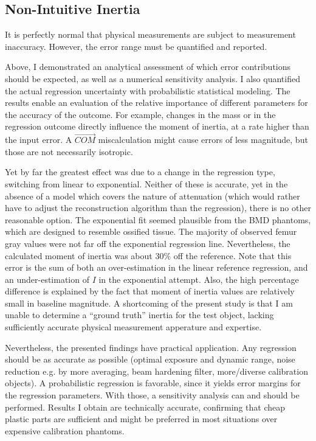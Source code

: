 \subsection{Non-Intuitive Inertia}
\label{sec:orga608fd2}
It is perfectly normal that physical measurements are subject to measurement inaccuracy.
However, the error range must be quantified and reported.

Above, I demonstrated an analytical assessment of which error contributions should be expected, as well as a numerical sensitivity analysis.
I also quantified the actual regression uncertainty with probabilistic statistical modeling.
The results enable an evaluation of the relative importance of different parameters for the accuracy of the outcome.
For example, changes in the mass or in the regression outcome directly influence the moment of inertia, at a rate higher than the input error.
A \(\vec{COM}\) miscalculation might cause errors of less magnitude, but those are not necessarily isotropic.


Yet by far the greatest effect was due to a change in the regression type, switching from linear to exponential.
Neither of these is accurate, yet in the absence of a model which covers the nature of attenuation (which would rather have to adjust the reconstruction algorithm than the regression), there is no other reasonable option.
The exponential fit seemed plausible from the BMD phantoms, which are designed to resemble ossified tissue.
The majority of observed femur gray values were not far off the exponential regression line.
Nevertheless, the calculated moment of inertia was about \(30 \%\) off the reference.
Note that this error is the sum of both an over-estimation in the linear reference regression, and an under-estimation of \(I\) in the exponential attempt.
Also, the high percentage difference is explained by the fact that moment of inertia values are relatively small in baseline magnitude.
A shortcoming of the present study is that I am unable to determine a ``ground truth'' inertia for the test object, lacking sufficiently accurate physical measurement apperature and expertise.


Nevertheless, the presented findings have practical application.
Any regression should be as accurate as possible (optimal exposure and dynamic range, noise reduction e.g. by more averaging, beam hardening filter, more/diverse calibration objects).
A probabilistic regression is favorable, since it yields error margins for the regression parameters.
With those, a sensitivity analysis can and should be performed.
Results I obtain are technically accurate, confirming that cheap plastic parts are sufficient and might be preferred in most situations over expensive calibration phantoms.


